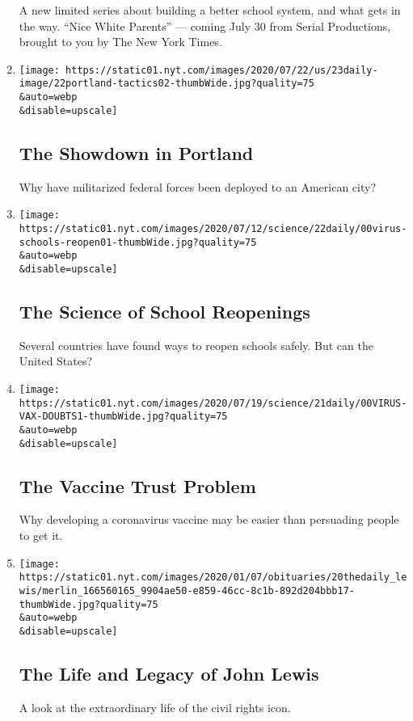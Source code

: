\begin{enumerate}
  A new limited series about building a better school system, and what
  gets in the way. ``Nice White Parents'' --- coming July 30 from Serial
  Productions, brought to you by The New York Times.
\item
  \href{/2020/07/23/podcasts/the-daily/portland-protests.html}{}

  \texttt{[image: https://static01.nyt.com/images/2020/07/22/us/23daily-image/22portland-tactics02-thumbWide.jpg?quality=75\\\&auto=webp\\\&disable=upscale]}

  \hypertarget{the-showdown-in-portland}{%
  \subsection{The Showdown in Portland}\label{the-showdown-in-portland}}

  Why have militarized federal forces been deployed to an American city?
\item
  \href{/2020/07/22/podcasts/the-daily/school-reopenings-coronavirus.html}{}

  \texttt{[image: https://static01.nyt.com/images/2020/07/12/science/22daily/00virus-schools-reopen01-thumbWide.jpg?quality=75\\\&auto=webp\\\&disable=upscale]}

  \hypertarget{the-science-of-school-reopenings}{%
  \subsection{The Science of School
  Reopenings}\label{the-science-of-school-reopenings}}

  Several countries have found ways to reopen schools safely. But can
  the United States?
\item
  \href{/2020/07/21/podcasts/the-daily/coronavirus-vaccine.html}{}

  \texttt{[image: https://static01.nyt.com/images/2020/07/19/science/21daily/00VIRUS-VAX-DOUBTS1-thumbWide.jpg?quality=75\\\&auto=webp\\\&disable=upscale]}

  \hypertarget{the-vaccine-trust-problem}{%
  \subsection{The Vaccine Trust
  Problem}\label{the-vaccine-trust-problem}}

  Why developing a coronavirus vaccine may be easier than persuading
  people to get it.
\item
  \href{/2020/07/20/podcasts/the-daily/john-lewis.html}{}

  \texttt{[image: https://static01.nyt.com/images/2020/01/07/obituaries/20thedaily\_lewis/merlin\_166560165\_9904ae50-e859-46cc-8c1b-892d204bbb17-thumbWide.jpg?quality=75\\\&auto=webp\\\&disable=upscale]}

  \hypertarget{the-life-and-legacy-of-john-lewis}{%
  \subsection{The Life and Legacy of John
  Lewis}\label{the-life-and-legacy-of-john-lewis}}

  A look at the extraordinary life of the civil rights icon.
\end{enumerate}

